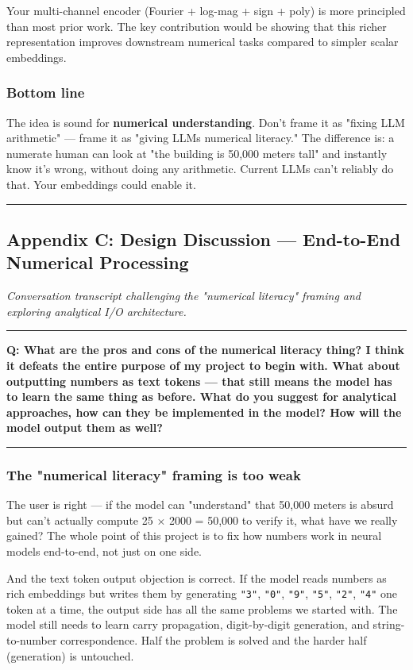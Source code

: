 \documentclass[11pt]{article}
\begin{document}
Your multi-channel encoder (Fourier + log-mag + sign + poly) is more principled than most prior work. The key contribution would be showing that this richer representation improves downstream numerical tasks compared to simpler scalar embeddings.


\subsubsection*{Bottom line}


The idea is sound for \textbf{numerical understanding}. Don't frame it as "fixing LLM arithmetic" — frame it as "giving LLMs numerical literacy." The difference is: a numerate human can look at "the building is 50,000 meters tall" and instantly know it's wrong, without doing any arithmetic. Current LLMs can't reliably do that. Your embeddings could enable it.


\noindent\rule{\textwidth}{0.4pt}


\subsection*{Appendix C: Design Discussion — End-to-End Numerical Processing}


\emph{Conversation transcript challenging the "numerical literacy" framing and exploring analytical I/O architecture.}


\noindent\rule{\textwidth}{0.4pt}


\textbf{Q: What are the pros and cons of the numerical literacy thing? I think it defeats the entire purpose of my project to begin with. What about outputting numbers as text tokens — that still means the model has to learn the same thing as before. What do you suggest for analytical approaches, how can they be implemented in the model? How will the model output them as well?}


\noindent\rule{\textwidth}{0.4pt}


\subsubsection*{The "numerical literacy" framing is too weak}


The user is right — if the model can "understand" that 50,000 meters is absurd but can't actually compute 25 × 2000 = 50,000 to verify it, what have we really gained? The whole point of this project is to fix how numbers work in neural models end-to-end, not just on one side.


And the text token output objection is correct. If the model reads numbers as rich embeddings but writes them by generating \texttt{"3"}, \texttt{"0"}, \texttt{"9"}, \texttt{"5"}, \texttt{"2"}, \texttt{"4"} one token at a time, the output side has all the same problems we started with. The model still needs to learn carry propagation, digit-by-digit generation, and string-to-number correspondence. Half the problem is solved and the harder half (generation) is untouched.
\end{document}
